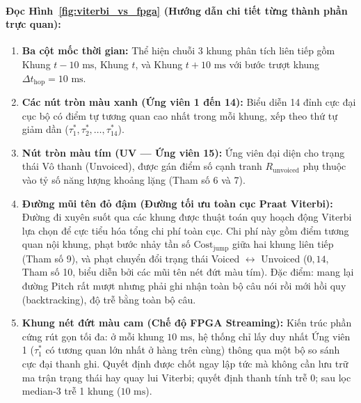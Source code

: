 \documentclass[11pt,a4paper]{article}
\begin{document}
\paragraph{Đọc Hình~\ref{fig:viterbi_vs_fpga} (Hướng dẫn chi tiết từng thành phần trực quan):}
\begin{enumerate}
    \setlength{\itemsep}{1.5pt}
    \item \textbf{Ba cột mốc thời gian:} Thể hiện chuỗi 3 khung phân tích liên tiếp gồm Khung $t - 10\text{ ms}$, Khung $t$, và Khung $t + 10\text{ ms}$ với bước trượt khung $\Delta t_{\text{hop}} = 10\text{ ms}$.
    \item \textbf{Các nút tròn màu xanh (Ứng viên 1 đến 14):} Biểu diễn 14 đỉnh cực đại cục bộ có điểm tự tương quan cao nhất trong mỗi khung, xếp theo thứ tự giảm dần ($\tau_1^*, \tau_2^*, \dots, \tau_{14}^*$).
    \item \textbf{Nút tròn màu tím (UV --- Ứng viên 15):} Ứng viên đại diện cho trạng thái Vô thanh (Unvoiced), được gán điểm số cạnh tranh $R_{\text{unvoiced}}$ phụ thuộc vào tỷ số năng lượng khoảng lặng (Tham số 6 và 7).
    \item \textbf{Đường mũi tên đỏ đậm (Đường tối ưu toàn cục Praat Viterbi):} Đường đi xuyên suốt qua các khung được thuật toán quy hoạch động Viterbi lựa chọn để cực tiểu hóa tổng chi phí toàn cục. Chi phí này gồm điểm tương quan nội khung, phạt bước nhảy tần số $\text{Cost}_{\text{jump}}$ giữa hai khung liên tiếp (Tham số 9), và phạt chuyển đổi trạng thái Voiced $\leftrightarrow$ Unvoiced ($0{,}14$, Tham số 10, biểu diễn bởi các mũi tên nét đứt màu tím). Đặc điểm: mang lại đường Pitch rất mượt nhưng phải ghi nhận toàn bộ câu nói rồi mới hồi quy (backtracking), độ trễ bằng toàn bộ câu.
    \item \textbf{Khung nét đứt màu cam (Chế độ FPGA Streaming):} Kiến trúc phần cứng rút gọn tối đa: ở mỗi khung $10\text{ ms}$, hệ thống chỉ lấy duy nhất Ứng viên 1 ($\tau_1^*$ có tương quan lớn nhất ở hàng trên cùng) thông qua một bộ so sánh cực đại thanh ghi. Quyết định được chốt ngay lập tức mà không cần lưu trữ ma trận trạng thái hay quay lui Viterbi; quyết định thanh tính trễ 0; sau lọc median-3 trễ 1 khung ($10\text{ ms}$).
\end{enumerate}
\end{document}
